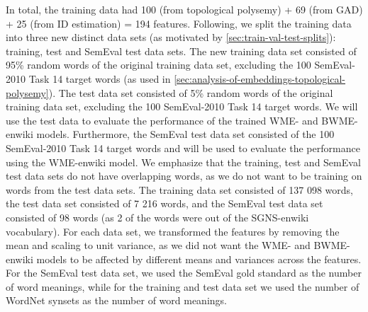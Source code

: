In total, the training data had 100 (from topological polysemy) + 69 (from GAD) + 25 (from ID estimation) = 194 features. Following, we split the training data into three new distinct data sets (as motivated by \cref{sec:train-val-test-splits}): training, test and SemEval test data sets. The new training data set consisted of 95\% random words of the original training data set, excluding the 100 SemEval-2010 Task 14 target words (as used in \cref{sec:analysis-of-embeddings-topological-polysemy}). The test data set consisted of 5\% random words of the original training data set, excluding the 100 SemEval-2010 Task 14 target words. We will use the test data to evaluate the performance of the trained WME- and BWME-enwiki models. Furthermore, the SemEval test data set consisted of the 100 SemEval-2010 Task 14 target words and will be used to evaluate the performance using the WME-enwiki model. We emphasize that the training, test and SemEval test data sets do not have overlapping words, as we do not want to be training on words from the test data sets. The training data set consisted of 137 098 words, the test data set consisted of 7 216 words, and the SemEval test data set consisted of 98 words (as 2 of the words were out of the SGNS-enwiki vocabulary). For each data set, we transformed the features by removing the mean and scaling to unit variance, as we did not want the WME- and BWME-enwiki models to be affected by different means and variances across the features. For the SemEval test data set, we used the SemEval gold standard as the number of word meanings, while for the training and test data set we used the number of WordNet synsets as the number of word meanings.

